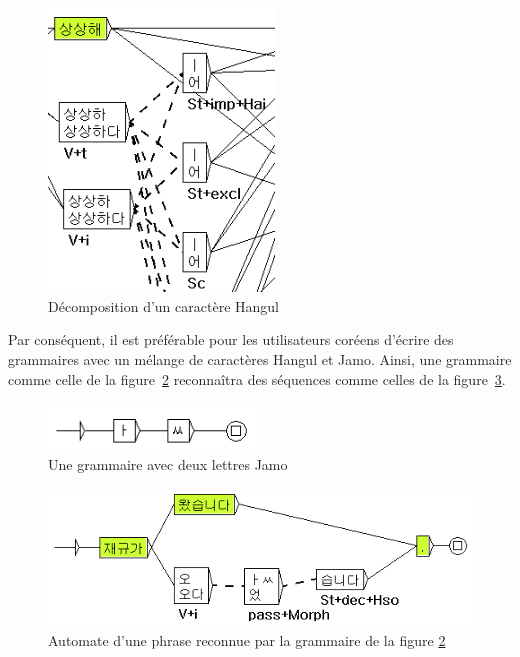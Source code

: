 \begin{figure}[!ht]
\begin{center}
\includegraphics[width=6cm]{resources/img/fig7-korean2.png}
\caption{Décomposition d'un caractère Hangul\label{fig7-korean2}}
\end{center}
\end{figure}

\bigskip
\noindent Par conséquent, il est préférable pour les utilisateurs coréens d'écrire des grammaires
avec un mélange de caractères Hangul et Jamo. Ainsi, une grammaire comme celle de la
figure~\ref{fig7-korean3} reconnaîtra des séquences comme celles de la figure~\ref{fig7-korean4}.

\begin{figure}[!ht]
\begin{center}
\includegraphics[width=5.5cm]{resources/img/fig7-korean3.png}
\caption{Une grammaire avec deux lettres Jamo\label{fig7-korean3}}
\end{center}
\end{figure}

\begin{figure}[!ht]
\begin{center}
\includegraphics[width=13cm]{resources/img/fig7-korean4.png}
\caption{Automate d'une phrase reconnue par la grammaire de la
figure \ref{fig7-korean3}\label{fig7-korean4}}
\end{center}
\end{figure}

